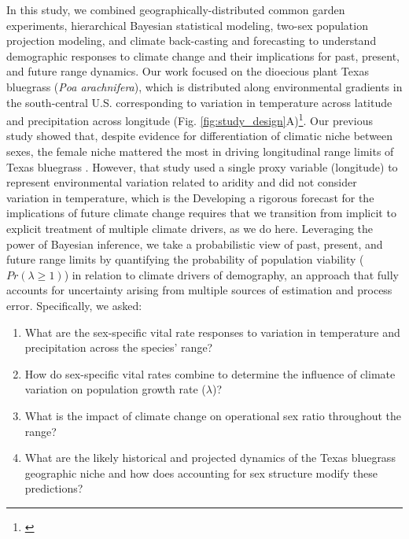 \documentclass[9pt,twocolumn,twoside,lineno]{pnas-new}
\newcommand{\jacob}[2]{{\color{blue}{#1}}\footnote{\textit{\color{blue}{#2}}}}
\begin{document}
In this study, we combined geographically-distributed common garden experiments, hierarchical Bayesian statistical modeling, two-sex population projection modeling, and climate back-casting and forecasting to understand demographic responses to climate change and their implications for past, present, and future range dynamics. 
Our work focused on the dioecious plant Texas bluegrass (\textit{Poa arachnifera}), which is distributed along environmental gradients in the south-central U.S. corresponding to variation in temperature across latitude and precipitation across longitude (Fig. \ref{fig:study_design}A)\jacob{}{Fig. A  does not show what we are saying here. Maybe I should add the Figure with the raster}. 
Our previous study showed that, despite evidence for differentiation of climatic niche between sexes, the female niche mattered the most in driving longitudinal range limits of Texas bluegrass \citep{miller2022two}. 
However, that study used a single proxy variable (longitude) to represent environmental variation related to aridity and did not consider variation in temperature, which is the %
Developing a rigorous forecast for the implications of future climate change requires that we transition from implicit to explicit treatment of multiple climate drivers, as we do here.
Leveraging the power of Bayesian inference, we take a probabilistic view of past, present, and future range limits by quantifying the probability of population viability ($Pr(\lambda\ge1)$) in relation to climate drivers of demography, an approach that fully accounts for uncertainty arising from multiple sources of estimation and process error. %
Specifically, we asked: 
\begin{enumerate}
	\item What are the sex-specific vital rate responses to variation in temperature and precipitation across the species' range?
	\item How do sex-specific vital rates combine to determine the influence of climate variation on population growth rate ($\lambda$)?
	\item What is the impact of climate change on operational sex ratio throughout the range?
	\item What are the likely historical and projected dynamics of the Texas bluegrass geographic niche and how does accounting for sex structure modify these predictions?
\end{enumerate}
\end{document}
